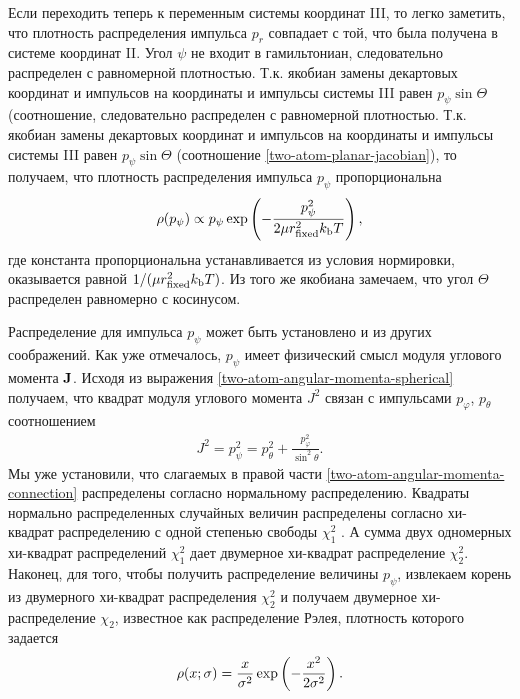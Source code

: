 Если переходить теперь к переменным системы координат III, то легко заметить, что плотность распределения импульса $p_r$ совпадает с той, что была получена в системе координат II. Угол $\psi$ не входит в гамильтониан, следовательно распределен с равномерной плотностью. Т.к. якобиан замены декартовых координат и импульсов на координаты и импульсы системы III равен $p_\psi \sin \Theta$ (соотношение, следовательно распределен с равномерной плотностью. Т.к. якобиан замены декартовых координат и импульсов на координаты и импульсы системы III равен $p_\psi \sin \Theta$ (соотношение \eqref{two-atom-planar-jacobian}), то получаем, что плотность распределения импульса $p_\psi$ пропорциональна
\begin{gather}
    \rho(p_\psi) \propto p_\psi \exp \left( -\frac{p_\psi^2}{2 \mu r_\text{fixed}^2 k_\text{b} T} \right), \label{two-atom-ppsi-distribution}
\end{gather}
где константа пропорциональна устанавливается из условия нормировки, оказывается равной $1/(\mu r_\text{fixed}^2 k_\text{b} T)$. Из того же якобиана замечаем, что угол $\Theta$ распределен равномерно с косинусом. \par
Распределение для импульса $p_\psi$ может быть установлено и из других соображений. Как уже отмечалось, $p_\psi$ имеет физический смысл модуля углового момента $\mathbf{J}$. Исходя из выражения \eqref{two-atom-angular-momenta-spherical} получаем, что квадрат модуля углового момента $J^2$ связан с импульсами $p_\varphi$, $p_\theta$ соотношением
\begin{gather}
    J^2 = p_\psi^2 = p_\theta^2 + \frac{p_\varphi^2}{\sin^2 \theta}. \label{two-atom-angular-momenta-connection} 
\end{gather}
Мы уже установили, что слагаемых в правой части \eqref{two-atom-angular-momenta-connection} распределены согласно нормальному распределению. Квадраты нормально распределенных случайных величин распределены согласно хи-квадрат распределению с одной степенью свободы $\chi_1^2$ \cite{castaneda}. А сумма двух одномерных хи-квадрат распределений $\chi_1^2$ дает двумерное хи-квадрат распределение $\chi_2^2$. Наконец, для того, чтобы получить распределение величины $p_\psi$, извлекаем корень из двумерного хи-квадрат распределения $\chi_2^2$ и получаем двумерное хи-распределение $\chi_2$, известное как распределение Рэлея, плотность которого задается  
\begin{gather}
    \rho(x; \sigma) = \frac{x}{\sigma^2} \exp \left( -\frac{x^2}{2 \sigma^2} \right). \label{rayleigh-density}
\end{gather}


